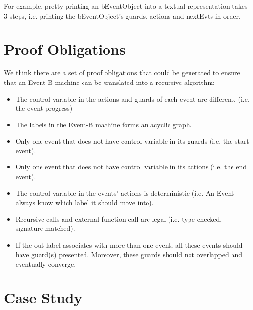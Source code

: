 \documentclass{easychair}
\begin{document}
For example, pretty printing an bEventObject into a textual representation takes 3-steps, i.e. printing the bEventObject's guards, actions and nextEvts in order.



\section{Proof Obligations}
We think there are a set of proof obligations that could be generated to ensure that an Event-B machine can be translated into a recursive algorithm:
\begin{itemize}
	\item The control variable in the actions and guards of each event are different. (i.e. the event progress)
	\item The labels in the Event-B machine forms an acyclic graph.
	\item Only one event that does not have control variable in its guards (i.e. the start event).
	\item Only one event that does not have control variable in its actions (i.e. the end event).
	\item The control variable in the events' actions is deterministic (i.e. An Event always know which label it should move into).
	\item Recursive calls and external function call are legal (i.e. type checked, signature matched).
	\item If the out label associates with more than one event, all these events should have guard(s) presented. Moreover, these guards should not overlapped and eventually converge.
\end{itemize}

\newpage
\section{Case Study}
\end{document}
